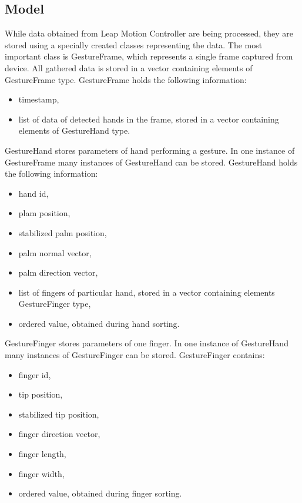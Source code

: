 \subsection{Model}\label{modelSubsection}

While data obtained from Leap Motion Controller are being processed, they are stored using a specially created classes representing the data. The most important class is GestureFrame, which represents a single frame captured from device. All gathered data is stored in a vector containing elements of GestureFrame type. GestureFrame holds the following information:

\begin{itemize}
\item timestamp,
\item list of data of detected hands in the frame, stored in a vector containing elements of GestureHand type.
\end{itemize}

GestureHand stores parameters of hand performing a gesture. In one instance of GestureFrame many instances of GestureHand can be stored. GestureHand holds the following information:
\begin{itemize}
\item hand id,
\item plam position,
\item stabilized palm position,
\item palm normal vector,
\item palm direction vector,
\item list of fingers of particular hand, stored in a vector containing elements GestureFinger type,
\item ordered value, obtained during hand sorting.
\end{itemize}

GestureFinger stores parameters of one finger. In one instance of GestureHand many instances of GestureFinger can be stored. GestureFinger contains:
\begin{itemize}
\item finger id,
\item tip position,
\item stabilized tip position,
\item finger direction vector,
\item finger length,
\item finger width,
\item ordered value, obtained during finger sorting.
\end{itemize}

